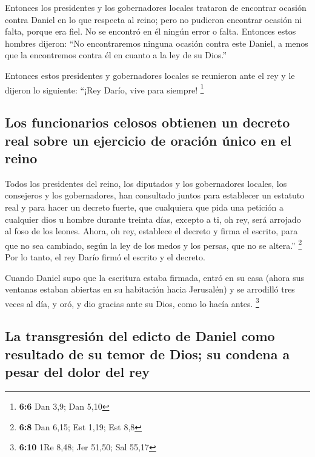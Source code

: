  Entonces los presidentes y los gobernadores locales
trataron de encontrar ocasión contra Daniel en lo que respecta al reino;
pero no pudieron encontrar ocasión ni falta, porque era fiel. No se
encontró en él ningún error o falta.  Entonces estos
hombres dijeron: ``No encontraremos ninguna ocasión contra este Daniel,
a menos que la encontremos contra él en cuanto a la ley de su Dios.''

 Entonces estos presidentes y gobernadores locales se
reunieron ante el rey y le dijeron lo siguiente: ``¡Rey Darío, vive para
siempre! \footnote{\textbf{6:6} Dan 3,9; Dan 5,10}

\hypertarget{los-funcionarios-celosos-obtienen-un-decreto-real-sobre-un-ejercicio-de-oraciuxf3n-uxfanico-en-el-reino}{%
\subsection{Los funcionarios celosos obtienen un decreto real sobre un
ejercicio de oración único en el
reino}\label{los-funcionarios-celosos-obtienen-un-decreto-real-sobre-un-ejercicio-de-oraciuxf3n-uxfanico-en-el-reino}}

 Todos los presidentes del reino, los diputados y los
gobernadores locales, los consejeros y los gobernadores, han consultado
juntos para establecer un estatuto real y para hacer un decreto fuerte,
que cualquiera que pida una petición a cualquier dios u hombre durante
treinta días, excepto a ti, oh rey, será arrojado al foso de los leones.
 Ahora, oh rey, establece el decreto y firma el escrito,
para que no sea cambiado, según la ley de los medos y los persas, que no
se altera.'' \footnote{\textbf{6:8} Dan 6,15; Est 1,19; Est 8,8}
 Por lo tanto, el rey Darío firmó el escrito y el decreto.

 Cuando Daniel supo que la escritura estaba firmada,
entró en su casa (ahora sus ventanas estaban abiertas en su habitación
hacia Jerusalén) y se arrodilló tres veces al día, y oró, y dio gracias
ante su Dios, como lo hacía antes. \footnote{\textbf{6:10} 1Re 8,48; Jer
  51,50; Sal 55,17}

\hypertarget{la-transgresiuxf3n-del-edicto-de-daniel-como-resultado-de-su-temor-de-dios-su-condena-a-pesar-del-dolor-del-rey}{%
\subsection{La transgresión del edicto de Daniel como resultado de su
temor de Dios; su condena a pesar del dolor del
rey}\label{la-transgresiuxf3n-del-edicto-de-daniel-como-resultado-de-su-temor-de-dios-su-condena-a-pesar-del-dolor-del-rey}}

